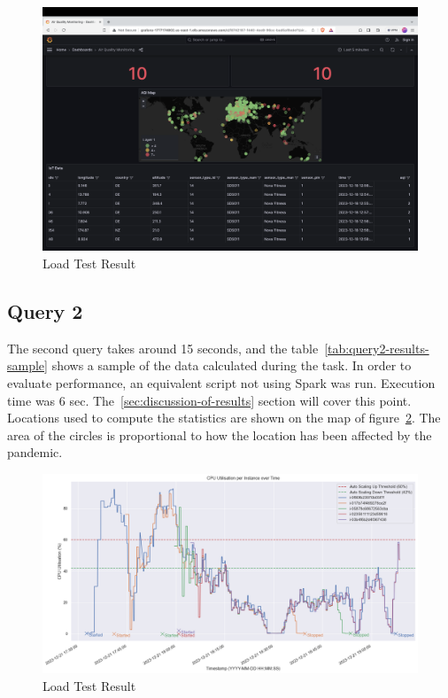 \documentclass[12pt,oneside]{book} %
\begin{document}
\begin{figure}[H]
    \centering
    \includegraphics[width=1\linewidth]{images/grafana-3.png}
    \caption{Load Test Result}\label{fig:top-100-locations-most-affected}
\end{figure}

\newpage
\subsection{Query 2}

The second query takes around 15 seconds, and the
table~\ref{tab:query2-results-sample} shows a sample of the data calculated
during the task. In order to evaluate performance, an equivalent script not
using Spark was run. Execution time was 6 sec.
The~\ref{sec:discussion-of-results} section will cover this point. Locations
used to compute the statistics are shown on the map of
figure~\ref{fig:top-100-locations-most-affected}. The area of the circles is
proportional to how the location has been affected by the pandemic.

\begin{figure}[H]
    \centering
    \includegraphics[width=1\linewidth]{images/autoscaling-test.png}
    \caption{Load Test Result}\label{fig:top-100-locations-most-affected}
\end{figure}
\end{document}

